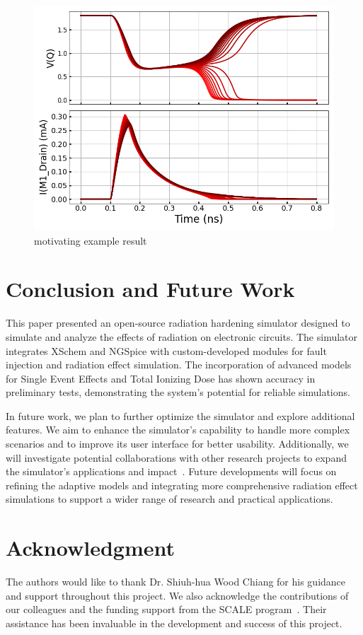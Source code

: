 \documentclass[conference]{IEEEtran}
\begin{document}
    
    
    \begin{figure}[htbp]
        \centering
        \includegraphics[width=0.95\linewidth]{SRAM_Response_Multi}
        \caption{motivating example result}
        \label{fig:motivating_example_result}
    \end{figure}

    \section{Conclusion and Future Work}\label{sec:conclusion-and-future-work}
    This paper presented an open-source radiation hardening simulator designed to simulate and analyze the effects of radiation on electronic circuits.
    The simulator integrates XSchem and NGSpice with custom-developed modules for fault injection and radiation effect simulation.
    The incorporation of advanced models for Single Event Effects and Total Ionizing Dose has shown accuracy in preliminary tests, demonstrating the system's potential for reliable simulations.

    In future work, we plan to further optimize the simulator and explore additional features.
    We aim to enhance the simulator's capability to handle more complex scenarios and to improve its user interface for better usability.
    Additionally, we will investigate potential collaborations with other research projects to expand the simulator's applications and impact~\cite{Pepper1990}.
    Future developments will focus on refining the adaptive models and integrating more comprehensive radiation effect simulations to support a wider range of research and practical applications.

    \section*{Acknowledgment}
    The authors would like to thank Dr. Shiuh-hua Wood Chiang for his guidance and support throughout this project.
    We also acknowledge the contributions of our colleagues and the funding support from the SCALE program~\cite{SCALE}.
    Their assistance has been invaluable in the development and success of this project.

    
    
\end{document}
